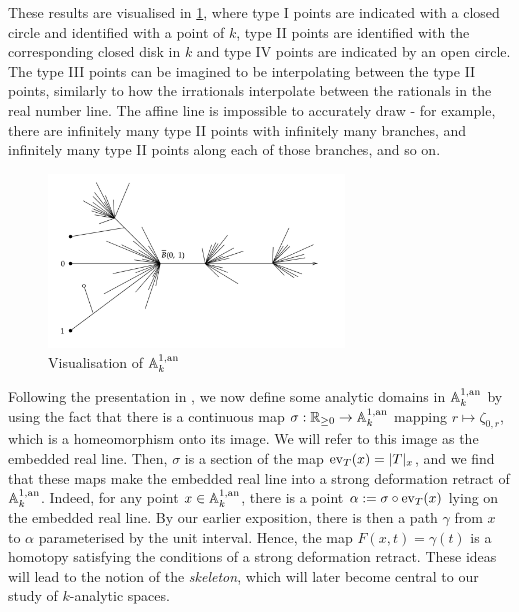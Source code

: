 These results are visualised in \cref{fig:affline}, where type I points are indicated with a closed circle and identified with a point of $k$, type II points are identified with the corresponding closed disk in $k$ and type IV points are indicated by an open circle. The type III points can be imagined to be interpolating between the type II points, similarly to how the irrationals interpolate between the rationals in the real number line. 
The affine line is impossible to accurately draw - for example, there are infinitely many type II points with infinitely many branches, and infinitely many type II points along each of those branches, and so on.

\begin{figure}
    \centering
    \includegraphics[width=0.7\textwidth]{Images/affineline.png}
    \caption{Visualisation of $\mathbb{A}^{1, \text{an}}_{k}$}
    \label{fig:affline}
\end{figure}

Following the presentation in \parencite{bpr}, we now define some analytic domains in $\mathbb{A}^{1, \text{an}}_{k}$ by using the fact that there is a continuous map $\sigma: \mathbb{R}_{\geq 0} \to \mathbb{A}^{1, \text{an}}_{k}$ mapping $r \mapsto \zeta_{0, r}$, which is a homeomorphism onto its image. 
We will refer to this image as the embedded real line. 
Then, $\sigma$ is a section of the map $\operatorname{ev}_{T}(x) = |T|_x$, and we find that these maps make the embedded real line into a strong deformation retract of $\mathbb{A}^{1, \text{an}}_{k}$. 
Indeed, for any point $x \in \mathbb{A}^{1, \text{an}}_{k}$, there is a point $\alpha := \sigma \circ \operatorname{ev}_{T}(x)$ lying on the embedded real line. 
By our earlier exposition, there is then a path $\gamma$ from $x$ to $\alpha$ parameterised by the unit interval. 
Hence, the map $F(x, t) = \gamma(t)$ is a homotopy satisfying the conditions of a strong deformation retract. 
These ideas will lead to the notion of the \textit{skeleton}, which will later become central to our study of $k$-analytic spaces.


